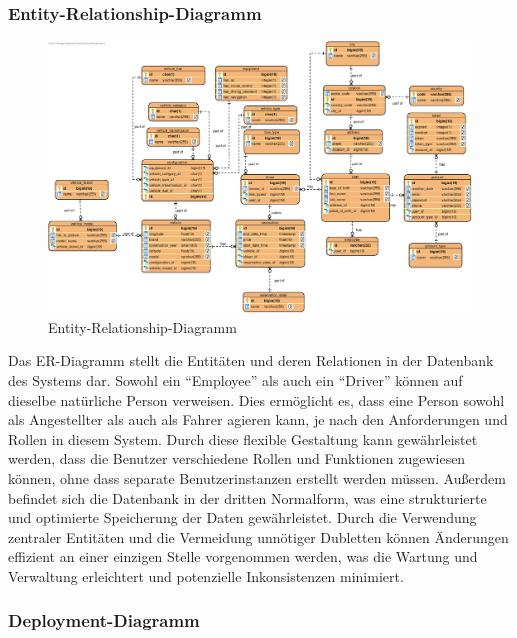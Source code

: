 \subsubsection{Entity-Relationship-Diagramm}
\begin{figure} [H]
    \centering
    \includegraphics[width=1\textwidth]{pictures/Fastlane-ERD}
    \caption{Entity-Relationship-Diagramm}
    \label{fig:ERD}
\end{figure}

\bigskip

Das ER-Diagramm stellt die Entitäten und deren Relationen in der Datenbank des Systems dar.
Sowohl ein \enquote{Employee} als auch ein \enquote{Driver} können auf dieselbe natürliche Person verweisen.
Dies ermöglicht es, dass eine Person sowohl als Angestellter als auch als Fahrer agieren kann, je nach den Anforderungen und Rollen in diesem System.
Durch diese flexible Gestaltung kann gewährleistet werden, dass die Benutzer verschiedene Rollen und Funktionen zugewiesen können, ohne dass separate Benutzerinstanzen erstellt werden müssen.
Außerdem befindet sich die Datenbank in der dritten Normalform, was eine strukturierte und optimierte Speicherung der Daten gewährleistet.
Durch die Verwendung zentraler Entitäten und die Vermeidung unnötiger Dubletten können Änderungen effizient an einer einzigen Stelle vorgenommen werden, was die Wartung und Verwaltung erleichtert und potenzielle Inkonsistenzen minimiert.

\bigskip

\subsubsection{Deployment-Diagramm}


